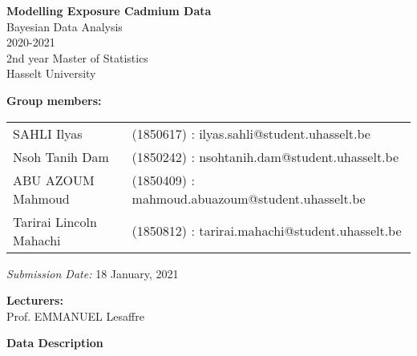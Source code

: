 \documentclass[11pt]{article}
\begin{document}
\clearpage\thispagestyle{empty}

\begin{center}
\textbf{\Large{Modelling Exposure Cadmium Data}} \\[0.5cm]
\Large{
Bayesian Data Analysis \\

2020-2021 \\[0.5cm]
2nd year Master of Statistics \\
Hasselt University
}
\end{center}

\vspace*{1cm}
\textbf{\large{Group members:}}\\
\begin{table}[h]
	\begin{tabular}{ll}
		SAHLI Ilyas&(1850617) : ilyas.sahli@student.uhasselt.be \\
		Nsoh Tanih Dam &(1850242) : nsohtanih.dam@student.uhasselt.be  \\
		ABU AZOUM Mahmoud &(1850409) : mahmoud.abuazoum@student.uhasselt.be \\
		Tarirai Lincoln Mahachi &(1850812) : tarirai.mahachi@student.uhasselt.be \\
	\end{tabular}
\end{table}

\noindent\textit{Submission Date:} 18 January, 2021

\vspace*{2.5cm}
\textbf{\large{Lecturers:}}\\
Prof. EMMANUEL Lesaffre \\

\newpage \setcounter{page}{1}

\textbf{Data Description}
\end{document}
